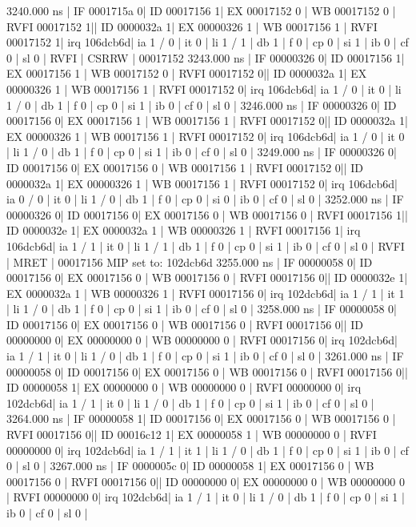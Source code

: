 \begin{terminal}
    3240.000 ns | IF 0001715a  0| ID 00017156 1| EX 00017152 0 | WB 00017152 0 | RVFI 00017152 1|| ID 0000032a  1| EX 00000326 1 | WB 00017156 1 | RVFI 00017152 1| irq 106dcb6d| ia 1 / 0 | it 0 |  li 1 / 1 | db 1 | f 0 | cp 0 | si 1 | ib 0 | cf 0 | sl 0 | RVFI | CSRRW    | 00017152
    3243.000 ns | IF 00000326  0| ID 00017156 1| EX 00017156 1 | WB 00017152 0 | RVFI 00017152 0|| ID 0000032a  1| EX 00000326 1 | WB 00017156 1 | RVFI 00017152 0| irq 106dcb6d| ia 1 / 0 | it 0 |  li 1 / 0 | db 1 | f 0 | cp 0 | si 1 | ib 0 | cf 0 | sl 0 |
    3246.000 ns | IF 00000326  0| ID 00017156 0| EX 00017156 1 | WB 00017156 1 | RVFI 00017152 0|| ID 0000032a  1| EX 00000326 1 | WB 00017156 1 | RVFI 00017152 0| irq 106dcb6d| ia 1 / 0 | it 0 |  li 1 / 0 | db 1 | f 0 | cp 0 | si 1 | ib 0 | cf 0 | sl 0 |
    3249.000 ns | IF 00000326  0| ID 00017156 0| EX 00017156 0 | WB 00017156 1 | RVFI 00017152 0|| ID 0000032a  1| EX 00000326 1 | WB 00017156 1 | RVFI 00017152 0| irq 106dcb6d| ia 0 / 0 | it 0 |  li 1 / 0 | db 1 | f 0 | cp 0 | si 0 | ib 0 | cf 0 | sl 0 |
    3252.000 ns | IF 00000326  0| ID 00017156 0| EX 00017156 0 | WB 00017156 0 | RVFI 00017156 1|| ID 0000032e  1| EX 0000032a 1 | WB 00000326 1 | RVFI 00017156 1| irq 106dcb6d| ia 1 / 1 | it 0 |  li 1 / 1 | db 1 | f 0 | cp 0 | si 1 | ib 0 | cf 0 | sl 0 | RVFI | MRET     | 00017156
MIP set to: 102dcb6d
    3255.000 ns | IF 00000058  0| ID 00017156 0| EX 00017156 0 | WB 00017156 0 | RVFI 00017156 0|| ID 0000032e  1| EX 0000032a 1 | WB 00000326 1 | RVFI 00017156 0| irq 102dcb6d| ia 1 / 1 | it 1 |  li 1 / 0 | db 1 | f 0 | cp 0 | si 1 | ib 0 | cf 0 | sl 0 |
    3258.000 ns | IF 00000058  0| ID 00017156 0| EX 00017156 0 | WB 00017156 0 | RVFI 00017156 0|| ID 00000000  0| EX 00000000 0 | WB 00000000 0 | RVFI 00017156 0| irq 102dcb6d| ia 1 / 1 | it 0 |  li 1 / 0 | db 1 | f 0 | cp 0 | si 1 | ib 0 | cf 0 | sl 0 |
    3261.000 ns | IF 00000058  0| ID 00017156 0| EX 00017156 0 | WB 00017156 0 | RVFI 00017156 0|| ID 00000058  1| EX 00000000 0 | WB 00000000 0 | RVFI 00000000 0| irq 102dcb6d| ia 1 / 1 | it 0 |  li 1 / 0 | db 1 | f 0 | cp 0 | si 1 | ib 0 | cf 0 | sl 0 |
    3264.000 ns | IF 00000058  1| ID 00017156 0| EX 00017156 0 | WB 00017156 0 | RVFI 00017156 0|| ID 00016c12  1| EX 00000058 1 | WB 00000000 0 | RVFI 00000000 0| irq 102dcb6d| ia 1 / 1 | it 1 |  li 1 / 0 | db 1 | f 0 | cp 0 | si 1 | ib 0 | cf 0 | sl 0 |
    3267.000 ns | IF 0000005c  0| ID 00000058 1| EX 00017156 0 | WB 00017156 0 | RVFI 00017156 0|| ID 00000000  0| EX 00000000 0 | WB 00000000 0 | RVFI 00000000 0| irq 102dcb6d| ia 1 / 1 | it 0 |  li 1 / 0 | db 1 | f 0 | cp 0 | si 1 | ib 0 | cf 0 | sl 0 |

\end{terminal}
